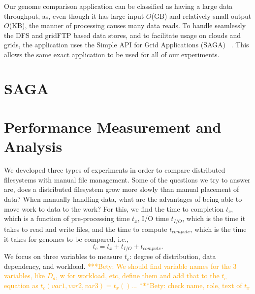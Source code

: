 \documentclass{rspublic}
\newcommand{\micnote}[1]{ {\textcolor{blue} { ***Michael: #1 }}}
\newcommand{\betynote}[1]{ {\textcolor{orange} { ***Bety: #1 }}}
\newcommand{\jhanote}[1]{} \newcommand{\micnote}[1]{}\newcommand{\betynote}[1]{} \newcommand{\fixme}[1]{}
\begin{document}

Our genome comparison application can be classified as having a large
data throughput, as, even though it
has large input $O$(GB) and relatively small output $O$(KB), the manner of 
processing causes many data reads.  To
handle seamlessly the DFS and gridFTP based data stores, and to 
facilitate usage on clouds and grids, the application
uses the Simple API for Grid Applications (SAGA) ~\citep{saga_web}.
This allows the same exact application to be used for all of our
experiments.  

\section{SAGA} \label{Sec:SAGA}

\section{Performance Measurement and Analysis}
We developed three types
of experiments in order to compare distributed filesystems with manual
file management. Some of the questions we try to answer are, 
does a distributed filesystem grow more slowly than
manual placement of data?  When manually handling data, what are the
advantages of being able to move work to data to the work? For this, we find 
the time to completion $t_c$, which is a function of pre-processing time $t_x$, I/O time $t_{I/O}$, which is the time it takes to read and write files, and the time to compute $t_{compute}$, which is the time it takes for genomes to be compared, i.e.,
\begin{equation}
t_c = t_x + t_{I/O} + t_{compute}.
\end{equation}
We focus on three variables to measure $t_c$:  degree of distribution, data
dependency, and workload.
\betynote{We should find variable names for the 3 variables, like $D_d$, w
 for workload, etc, define them and add that to the $t_c$ equation as $t_c(var1, var2, var3) = t_x()$...}
\betynote{check name, role, text of $t_x$}
\end{document}
